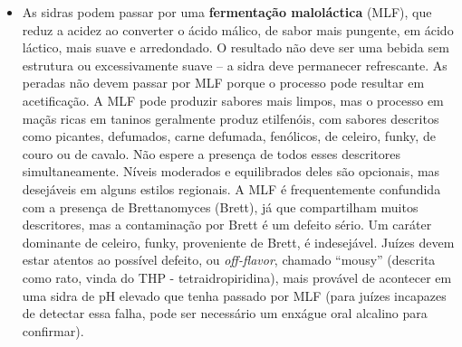 \begin{itemize}
\item As sidras podem passar por uma \textbf{fermentação maloláctica} (MLF), que reduz a acidez ao converter o ácido málico, de sabor mais pungente, em ácido láctico, mais suave e arredondado. O resultado não deve ser uma bebida sem estrutura ou excessivamente suave – a sidra deve permanecer refrescante. As peradas não devem passar por MLF porque o processo pode resultar em acetificação. A MLF pode produzir sabores mais limpos, mas o processo em maçãs ricas em taninos geralmente produz etilfenóis, com sabores descritos como picantes, defumados, carne defumada, fenólicos, de celeiro, funky, de couro ou de cavalo. Não espere a presença de todos esses descritores simultaneamente. Níveis moderados e equilibrados deles são opcionais, mas desejáveis em alguns estilos regionais. A MLF é frequentemente confundida com a presença de Brettanomyces (Brett), já que compartilham muitos descritores, mas a contaminação por Brett é um defeito sério. Um caráter dominante de celeiro, funky, proveniente de Brett, é indesejável. Juízes devem estar atentos ao possível defeito, ou \textit{off-flavor}, chamado “mousy” (descrita como rato, vinda do THP - tetraidropiridina), mais provável de acontecer em uma sidra de pH elevado que tenha passado por MLF (para juízes incapazes de detectar essa falha, pode ser necessário um enxágue oral alcalino para confirmar).
\end{itemize}
